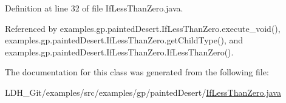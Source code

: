 Definition at line 32 of file If\-Less\-Than\-Zero.\-java.



Referenced by examples.\-gp.\-painted\-Desert.\-If\-Less\-Than\-Zero.\-execute\-\_\-void(), examples.\-gp.\-painted\-Desert.\-If\-Less\-Than\-Zero.\-get\-Child\-Type(), and examples.\-gp.\-painted\-Desert.\-If\-Less\-Than\-Zero.\-If\-Less\-Than\-Zero().



The documentation for this class was generated from the following file\-:\begin{DoxyCompactItemize}
\item 
L\-D\-H\-\_\-\-Git/examples/src/examples/gp/painted\-Desert/\hyperlink{_if_less_than_zero_8java}{If\-Less\-Than\-Zero.\-java}\end{DoxyCompactItemize}
